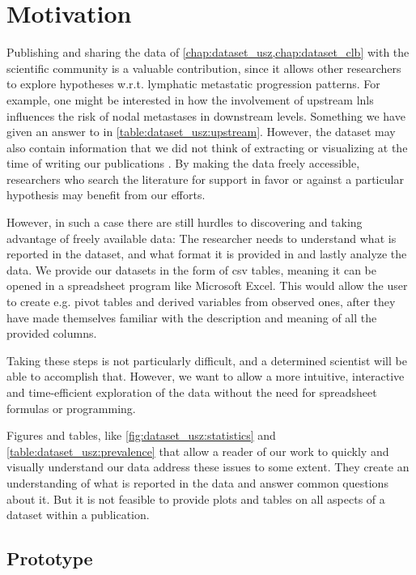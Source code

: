 \documentclass[\relativeRoot/main.tex]{subfiles}
\begin{document}
\section{Motivation}
\label{sec:lyprox:motivation}

Publishing and sharing the data of \cref{chap:dataset_usz,chap:dataset_clb} with the scientific community is a valuable contribution, since it allows other researchers to explore hypotheses w.r.t. lymphatic metastatic progression patterns. For example, one might be interested in how the involvement of upstream \glspl{lnl} influences the risk of nodal metastases in downstream levels. Something we have given an answer to in \cref{table:dataset_usz:upstream}. However, the dataset may also contain information that we did not think of extracting or visualizing at the time of writing our publications \cite{ludwig_detailed_2022,ludwig_dataset_2022}. By making the data freely accessible, researchers who search the literature for support in favor or against a particular hypothesis may benefit from our efforts.

However, in such a case there are still hurdles to discovering and taking advantage of freely available data: The researcher needs to understand what is reported in the dataset, and what format it is provided in and lastly analyze the data. We provide our datasets in the form of \acrshort{csv} tables, meaning it can be opened in a spreadsheet program like Microsoft Excel. This would allow the user to create e.g. pivot tables and derived variables from observed ones, after they have made themselves familiar with the description and meaning of all the provided columns.

Taking these steps is not particularly difficult, and a determined scientist will be able to accomplish that. However, we want to allow a more intuitive, interactive and time-efficient exploration of the data without the need for spreadsheet formulas or programming.

Figures and tables, like \cref{fig:dataset_usz:statistics} and \cref{table:dataset_usz:prevalence} that allow a reader of our work to quickly and visually understand our data address these issues to some extent. They create an understanding of what is reported in the data and answer common questions about it. But it is not feasible to provide plots and tables on all aspects of a dataset within a publication.

\subsection*{Prototype}
\label{subsec:lyprox:motivation:prototype}
\end{document}

